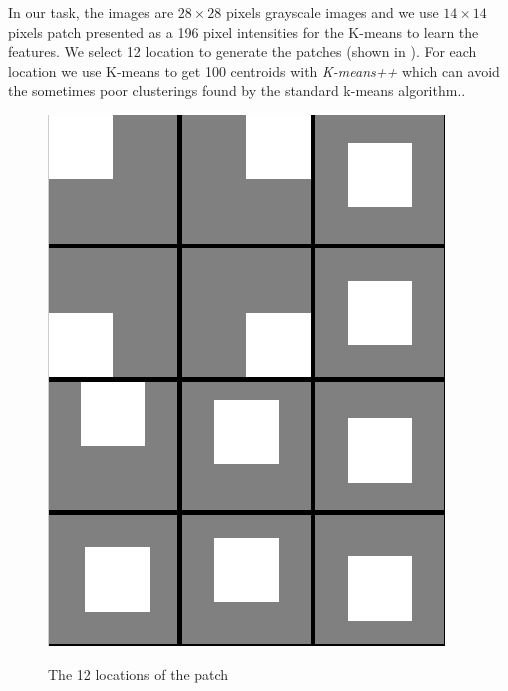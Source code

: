 In our task, the images are $28 \times 28$ pixels grayscale images and we use $14 \times 14$ pixels patch presented as a 196 pixel intensities for the K-means to learn the features. We select 12 location to generate the patches (shown in ). For each location we use K-means to get 100 centroids with \emph{K-means++} which can avoid the sometimes poor clusterings found by the standard k-means algorithm.\cite{arthur2007k}.
\begin{figure}
  \centering
  \includegraphics[scale=.5]{fig/patch_location.png}\\
  \caption{The 12 locations of the patch}
\end{figure}\label{location}

